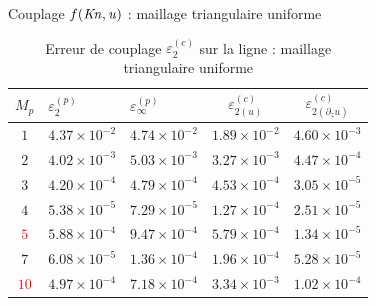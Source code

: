 \documentclass[aspect ratio=169,t]{beamer}
\numberwithin{equation}{section} %
\begin{document}
\begin{frame}{Couplage $f(\it Kn,u)$ : maillage triangulaire uniforme}

\begin{table}[!ht]
    \centering
    \begin{tabular}{c|ll|cc}
    \hline
            $M_p$ & $\varepsilon_{2}^{(p)}$ & $\varepsilon_{\infty}^{(p)}$  &$\varepsilon_{2 {(u)}}^{(c)}$&$\varepsilon_{2 {(\partial_z u)}}^{(c)}$ \\
    \hline
    $1$ & $4.37\times 10^{-2}$ & $4.74\times 10^{-2}$ &  $1.89\times 10^{-2}$  & $4.60\times 10^{-3}$ \\
    $2$ & $4.02\times 10^{-3}$ & $5.03\times 10^{-3}$ &  $3.27\times 10^{-3}$  & $4.47\times 10^{-4}$ \\
    $3$ & $4.20\times 10^{-4}$ & $4.79\times 10^{-4}$ &  $4.53\times 10^{-4}$  & $3.05\times 10^{-5}$ \\
    $4$ & $5.38\times 10^{-5}$ & $7.29\times 10^{-5}$ &  $1.27\times 10^{-4}$  & $2.51\times 10^{-5}$ \\
    \textcolor{red}{$5$} & $5.88\times 10^{-4}$ & $9.47\times 10^{-4}$ &  $5.79\times 10^{-4}$  & $1.34\times 10^{-5}$ \\
    $7$ & $6.08\times 10^{-5}$ & $1.36\times 10^{-4}$ &  $1.96\times 10^{-4}$  & $5.28\times 10^{-5}$ \\
    \textcolor{red}{$10$} & $4.97\times 10^{-4}$ & $7.18\times 10^{-4}$ &  $3.34\times 10^{-3}$ & $1.02\times 10^{-4}$ \\
    \hline
    \end{tabular}
    \caption{Erreur de couplage $\varepsilon_{2}^{(c)}$ sur la ligne : maillage triangulaire uniforme}
    \label{tab:ml_slip_coupling_unsu_triangle_uniform}
\end{table}
\end{frame}
\end{document}
